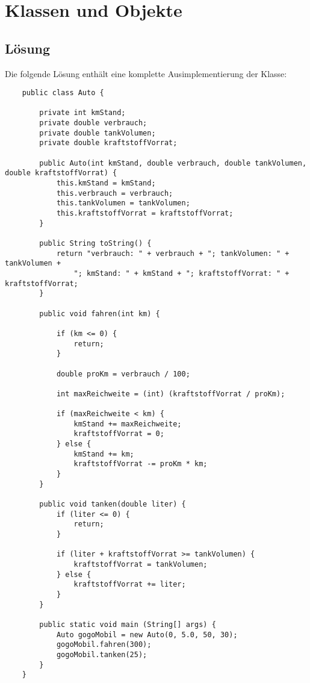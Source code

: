 \chapter{Klassen und Objekte}

\section{Lösung}

Die folgende Lösung enthält eine komplette Ausimplementierung der Klasse:

\begin{verbatim}
    public class Auto {

        private int kmStand;
        private double verbrauch;
        private double tankVolumen;
        private double kraftstoffVorrat;

        public Auto(int kmStand, double verbrauch, double tankVolumen, double kraftstoffVorrat) {
            this.kmStand = kmStand;
            this.verbrauch = verbrauch;
            this.tankVolumen = tankVolumen;
            this.kraftstoffVorrat = kraftstoffVorrat;
        }

        public String toString() {
            return "verbrauch: " + verbrauch + "; tankVolumen: " + tankVolumen +
                "; kmStand: " + kmStand + "; kraftstoffVorrat: " + kraftstoffVorrat;
        }

        public void fahren(int km) {

            if (km <= 0) {
                return;
            }

            double proKm = verbrauch / 100;

            int maxReichweite = (int) (kraftstoffVorrat / proKm);

            if (maxReichweite < km) {
                kmStand += maxReichweite;
                kraftstoffVorrat = 0;
            } else {
                kmStand += km;
                kraftstoffVorrat -= proKm * km;
            }
        }

        public void tanken(double liter) {
            if (liter <= 0) {
                return;
            }

            if (liter + kraftstoffVorrat >= tankVolumen) {
                kraftstoffVorrat = tankVolumen;
            } else {
                kraftstoffVorrat += liter;
            }
        }

        public static void main (String[] args) {
            Auto gogoMobil = new Auto(0, 5.0, 50, 30);
            gogoMobil.fahren(300);
            gogoMobil.tanken(25);
        }
    }
\end{verbatim}\\

